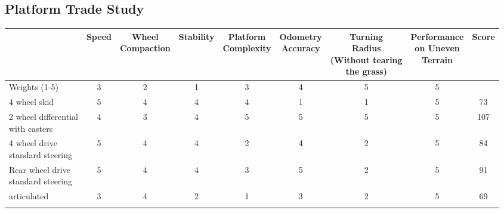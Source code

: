 \documentclass{article}
\begin{document}
	\subsection{Platform Trade Study}
		\begin{table}[H]
		\begin{adjustwidth}{-1.5in}{-1.5in}
		\setlength{\dashlinedash}{.4pt}

		\begin{tabular}{|l|c|c|c|c|c|c|c|c|}
		\hline
		                                   & Speed & \makecell{Wheel \\ Compaction} & Stability & \makecell{Platform \\ Complexity} & \makecell{Odometry \\ Accuracy} & \makecell{Turning \\ Radius \\(Without tearing \\ the grass)} & \makecell{Performance \\ on Uneven \\ Terrain} & Score \\ \hline
		Weights (1-5)                      & 3     & 2                & 1         & 3                   & 4                 & 5                                          & 5                             &       \\ \hline
		4 wheel skid                       & 5     & 4                & 4         & 4                   & 1                 & 1                                          & 5                             & 73    \\ \hdashline
		\makecell[l]{2 wheel differential \\ with casters}  & 4     & 3                & 4         & 5                   & 5                 & 5                                          & 5                             & 107   \\ \hdashline
		\makecell[l]{4 wheel drive \\ standard steering}    & 5     & 4                & 4         & 2                   & 4                 & 2                                          & 5                             & 84    \\ \hdashline
		\makecell[l]{Rear wheel drive \\ standard steering} & 5     & 4                & 4         & 3                   & 5                 & 2                                          & 5                             & 91    \\ \hdashline
		articulated                        & 3     & 4                & 2         & 1                   & 3                 & 2                                          & 5                             & 69    \\ \hdashline

\end{tabular}
\end{adjustwidth}
\end{table}
\end{document}
